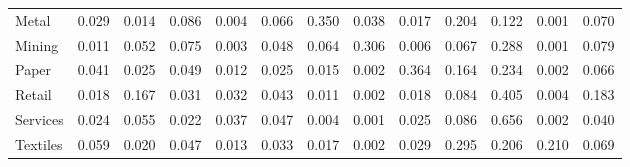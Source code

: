 \begin{table}[htbp]
\begin{tabular}{lcccccccccccc}
  Metal & \textcolor[RGB]{136,88,119}{0.029} & \textcolor[RGB]{177,115,78}{0.014} & \textcolor[RGB]{55,36,200}{0.086} & \textcolor[RGB]{214,139,41}{0.004} & \textcolor[RGB]{76,49,179}{0.066} & \textcolor[RGB]{16,10,239}{0.350} & \textcolor[RGB]{117,76,138}{0.038} & \textcolor[RGB]{170,110,85}{0.017} & \textcolor[RGB]{35,23,220}{0.204} & \textcolor[RGB]{53,34,202}{0.122} & \textcolor[RGB]{244,158,11}{0.001} & \textcolor[RGB]{67,44,188}{0.070} \\ 
  Mining & \textcolor[RGB]{197,127,58}{0.011} & \textcolor[RGB]{89,57,166}{0.052} & \textcolor[RGB]{62,40,193}{0.075} & \textcolor[RGB]{220,142,35}{0.003} & \textcolor[RGB]{99,64,156}{0.048} & \textcolor[RGB]{78,50,177}{0.064} & \textcolor[RGB]{19,13,236}{0.306} & \textcolor[RGB]{204,132,51}{0.006} & \textcolor[RGB]{71,46,184}{0.067} & \textcolor[RGB]{25,16,230}{0.288} & \textcolor[RGB]{246,159,9}{0.001} & \textcolor[RGB]{60,39,195}{0.079} \\ 
  Paper & \textcolor[RGB]{112,72,143}{0.041} & \textcolor[RGB]{147,95,108}{0.025} & \textcolor[RGB]{92,60,163}{0.049} & \textcolor[RGB]{189,123,66}{0.012} & \textcolor[RGB]{145,94,110}{0.025} & \textcolor[RGB]{174,112,81}{0.015} & \textcolor[RGB]{230,149,25}{0.002} & \textcolor[RGB]{12,8,243}{0.364} & \textcolor[RGB]{50,32,205}{0.164} & \textcolor[RGB]{30,19,225}{0.234} & \textcolor[RGB]{237,154,18}{0.002} & \textcolor[RGB]{74,48,181}{0.066} \\ 
  Retail & \textcolor[RGB]{165,107,90}{0.018} & \textcolor[RGB]{48,31,207}{0.167} & \textcolor[RGB]{129,84,126}{0.031} & \textcolor[RGB]{126,81,129}{0.032} & \textcolor[RGB]{108,70,147}{0.043} & \textcolor[RGB]{193,125,62}{0.011} & \textcolor[RGB]{228,148,27}{0.002} & \textcolor[RGB]{166,108,89}{0.018} & \textcolor[RGB]{58,38,197}{0.084} & \textcolor[RGB]{5,3,250}{0.405} & \textcolor[RGB]{211,136,44}{0.004} & \textcolor[RGB]{44,29,211}{0.183} \\ 
  Services & \textcolor[RGB]{149,96,106}{0.024} & \textcolor[RGB]{83,54,172}{0.055} & \textcolor[RGB]{158,102,97}{0.022} & \textcolor[RGB]{119,77,136}{0.037} & \textcolor[RGB]{103,66,152}{0.047} & \textcolor[RGB]{212,138,42}{0.004} & \textcolor[RGB]{248,160,7}{0.001} & \textcolor[RGB]{143,93,112}{0.025} & \textcolor[RGB]{57,37,198}{0.086} & \textcolor[RGB]{0,0,255}{0.656} & \textcolor[RGB]{227,147,28}{0.002} & \textcolor[RGB]{113,73,142}{0.040} \\ 
  Textiles & \textcolor[RGB]{81,53,174}{0.059} & \textcolor[RGB]{159,103,96}{0.020} & \textcolor[RGB]{104,68,151}{0.047} & \textcolor[RGB]{182,118,73}{0.013} & \textcolor[RGB]{122,79,133}{0.033} & \textcolor[RGB]{168,109,87}{0.017} & \textcolor[RGB]{241,156,14}{0.002} & \textcolor[RGB]{138,89,117}{0.029} & \textcolor[RGB]{23,15,232}{0.295} & \textcolor[RGB]{34,22,221}{0.206} & \textcolor[RGB]{32,21,223}{0.210} & \textcolor[RGB]{69,45,186}{0.069} \\ 

\end{tabular}
\end{table}
